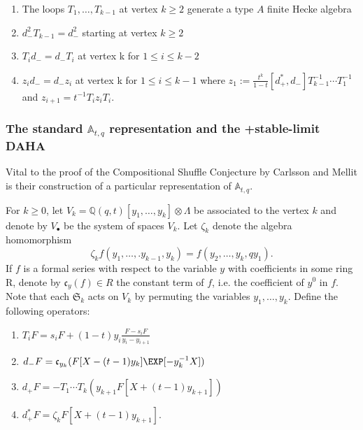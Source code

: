 \begin{center}

\begin{enumerate}
    \item The loops $T_1,\ldots,T_{k-1}$ at vertex $k\geq 2$ generate a type $A$ finite Hecke algebra 
    \item $d_{-}^2T_{k-1} = d_{-}^2$ starting at vertex $k \geq 2$
    \item  $T_id_{-} = d_{-}T_i$ at vertex k for $1\leq i\leq k-2$
    \item $z_id_{-}= d_{-}z_i$ at vertex k for $1\leq i \leq k-1$ where $z_1 := \frac{t^k}{1-t}[d_{+}^{*},d_{-}]T_{k-1}^{-1}\cdots T_{1}^{-1}$ and $z_{i+1} = t^{-1}T_iz_iT_i.$
 \end{enumerate}

 \end{center}


\subsubsection{The standard $\mathbb{A}_{t,q}$ representation and the +stable-limit DAHA}

Vital to the proof of the Compositional Shuffle Conjecture by Carlsson and Mellit \cite{CM_2015} is their construction of a particular representation of $\mathbb{A}_{t,q}$. 


\begin{defi}[\cite{CM_2015}]\label{A qt defns}
    For $k \geq 0$, let $V_k = \mathbb{Q}(q,t)[y_1,\ldots,y_k]\otimes \Lambda$ be associated to the vertex $k$ and denote by $V_{\bullet}$ be the system of spaces $V_k$. Let $\zeta_k$ denote the algebra homomorphism $$\zeta_kf(y_1,\ldots,.y_{k-1},y_k) = f(y_2,\ldots,y_k,qy_1).$$ If $f$ is a formal series with respect to the variable $y$ with coefficients in some ring R, denote by $\mathfrak{c}_{y}(f) \in R$ the constant term of $f$, i.e. the coefficient of $y^{0}$ in $f$. Note that each $\mathfrak{S}_k$ acts on $V_k$ by permuting the variables $y_1,\ldots,y_k.$ Define the following operators:
\begin{enumerate}
    \item $T_iF = s_iF + (1-t)y_i \frac{F-s_iF}{y_i-y_{i+1}}$
    \item $d_{-}F = \mathfrak{c}_{y_k}(F[X-(t-1)y_k]\EXP[-y_k^{-1}X])$
    \item $d_{+}F = -T_1\cdots T_k (y_{k+1}F[X+(t-1)y_{k+1}])$
    \item $d_{+}^{*}F = \zeta_kF[X+(t-1)y_{k+1}].$
\end{enumerate}
\end{defi}

